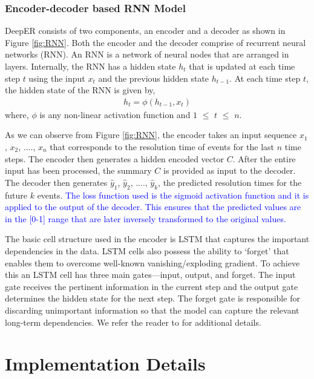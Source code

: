 \subsubsection{Encoder-decoder based RNN Model}
DeepER consists of two components, an encoder and a decoder as shown in Figure \ref{fig:RNN}. Both the encoder and the decoder comprise of recurrent neural networks (RNN). An RNN is a network of neural nodes that are arranged in layers.  Internally, the RNN has a hidden state $h_t$ that is updated at each time step $t$ using the input $x_t$ and the previous hidden state $h_{t-1}$.    At each time step $t$, the hidden state of the RNN is given by,
\begin{align}
\label{eqn:rnn}
h_t = \phi(h_{t-1}, x_t)
\end{align}
where, $\phi$ is any non-linear activation function and $1$ $\leq$ $t$ $\leq$ $n$.

As we can observe from Figure \ref{fig:RNN}, the encoder takes an input sequence $x_1$, $x_2$, ...., $x_n$ that corresponds to the resolution time of events for the last   $n$ time steps. The encoder then generates a hidden encoded vector $C$. After the entire input has been processed, the summary $C$ is provided as input to the decoder. The decoder then  generates $\hat{y}_1$, $\hat{y}_2$, ...., $\hat{y}_k$, the predicted resolution times for the future $k$ events. \textcolor{blue}{The loss function used is the sigmoid activation function and it is applied to the output of the decoder. This ensures that the predicted values are in the [0-1] range that are later inversely transformed to the original values.}

The basic cell structure used in the encoder is LSTM that captures the important dependencies in the data. LSTM cells also possess the ability to `forget' that enables them to overcome well-known vanishing/exploding gradient. To achieve this an LSTM cell has three main gates---input, output, and forget. The input gate receives the pertinent information in the current step and the output gate determines the hidden state for the next step. The forget gate is responsible for discarding unimportant information so that the model can capture the relevant long-term dependencies. We refer the reader to \cite{cho2014learning, sutskever2014sequence} for additional details.


\section{Implementation Details}
\label{sec:implementation}

